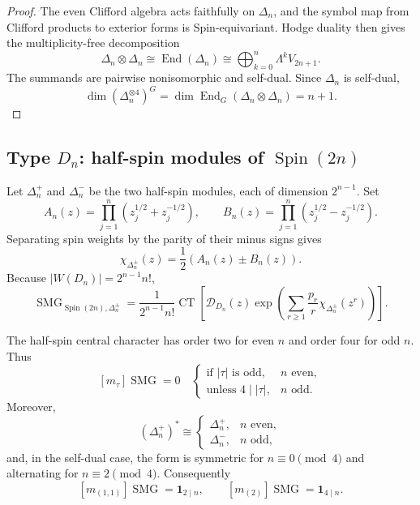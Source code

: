 \documentclass[10pt]{article}
\newcommand{\CT}{\operatorname{CT}}
\newcommand{\SMG}{\operatorname{SMG}}
\newcommand{\MGF}{\SMG}
\newcommand{\End}{\operatorname{End}}
\begin{document}
\begin{proof}
The even Clifford algebra acts faithfully on $\Delta_n$, and the symbol map
from Clifford products to exterior forms is Spin-equivariant.  Hodge duality
then gives the multiplicity-free decomposition
\begin{equation}\label{nd:spin_pin:eq:b-tensor-square}
 \Delta_n\otimes\Delta_n
 \cong\End(\Delta_n)
 \cong\bigoplus_{k=0}^{n}\Lambda^kV_{2n+1}.
\end{equation}
The summands are pairwise nonisomorphic and self-dual.  Since $\Delta_n$ is
self-dual,
\[
 \dim(\Delta_n^{\otimes4})^G
 =\dim\End_G(\Delta_n\otimes\Delta_n)=n+1.
\]
\end{proof}

\subsection{\texorpdfstring{Type $D_n$: half-spin modules of $\operatorname{Spin}(2n)$}%
{Type Dn: half-spin modules of Spin(2n)}}

Let $\Delta_n^+$ and $\Delta_n^-$ be the two half-spin modules, each of
dimension $2^{n-1}$.  Set
\[
 A_n(z)=\prod_{j=1}^n(z_j^{1/2}+z_j^{-1/2}),\qquad
 B_n(z)=\prod_{j=1}^n(z_j^{1/2}-z_j^{-1/2}).
\]
Separating spin weights by the parity of their minus signs gives
\begin{equation}\label{nd:spin_pin:eq:d-character}
 \chi_{\Delta_n^\pm}(z)=\frac12(A_n(z)\pm B_n(z)).
\end{equation}
Because $|W(D_n)|=2^{n-1}n!$,
\begin{equation}\label{nd:spin_pin:eq:d-mgf}
 \boxed{\MGF_{\operatorname{Spin}(2n),\Delta_n^\pm}
 =\frac1{2^{n-1}n!}\CT\!\left[\mathcal D_{D_n}(z)
 \exp\!\left(\sum_{r\ge1}\frac{p_r}{r}
 \chi_{\Delta_n^\pm}(z^r)\right)\right].}
\end{equation}

The half-spin central character has order two for even $n$ and order four
for odd $n$.  Thus
\begin{equation}\label{nd:spin_pin:eq:d-selection}
 [m_\tau]\MGF=0\quad
 \begin{cases}
 \text{if $|\tau|$ is odd},&n\text{ even},\\
 \text{unless $4\mid|\tau|$},&n\text{ odd}.
 \end{cases}
\end{equation}
Moreover,
\[
 (\Delta_n^+)^*\cong
 \begin{cases}\Delta_n^+,&n\text{ even},\\
 \Delta_n^-,&n\text{ odd},\end{cases}
\]
and, in the self-dual case, the form is symmetric for $n\equiv0\pmod4$
and alternating for $n\equiv2\pmod4$.  Consequently
\begin{equation}\label{nd:spin_pin:eq:d-quadratic}
 [m_{(1,1)}]\MGF=\mathbf1_{2\mid n},
 \qquad
 [m_{(2)}]\MGF=\mathbf1_{4\mid n}.
\end{equation}
\end{document}
